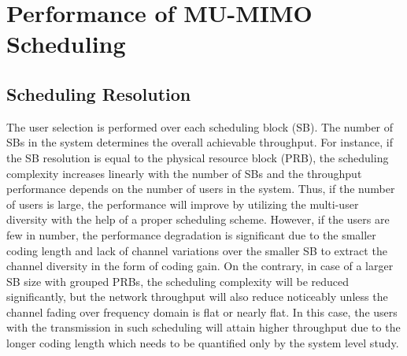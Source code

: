\documentclass[conference,letterpaper,9pt]{./../IEEEtran}
\begin{document}
\section{Performance of \ac{MU-MIMO} Scheduling}
\label{sec:perf_scheduling}
\subsection{Scheduling Resolution}
The user selection is performed over each scheduling block (SB). The number of SBs in the system determines the overall achievable throughput. For instance, if the SB resolution is equal to the physical resource block (PRB), the scheduling complexity increases linearly with the number of SBs and the throughput performance depends on the number of users in the system. Thus, if the number of users is large, the performance will improve by utilizing the multi-user diversity with the help of a proper scheduling scheme. However, if the users are few in number, the performance degradation is significant due to the smaller coding length and lack of channel variations over the smaller SB to extract the channel diversity in the form of coding gain. On the contrary, in case of a larger SB size with grouped PRBs, the scheduling complexity will be reduced significantly, but the network throughput will also reduce noticeably unless the channel fading over frequency domain is flat or nearly flat. In this case, the users with the transmission in such scheduling will attain higher throughput due to the longer coding length which needs to be quantified only by the system level study.
\end{document}

